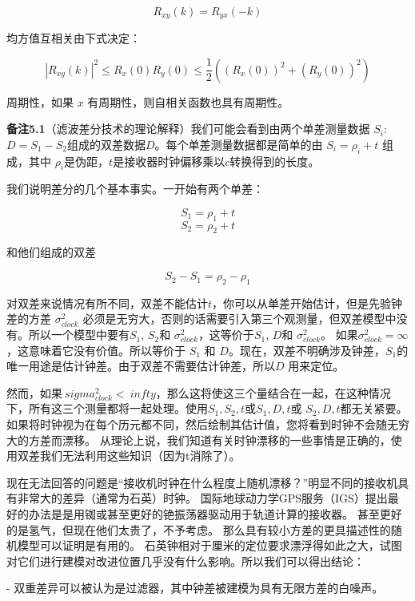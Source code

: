         \[ R_{xy}(k)=R_{yx}(-k) \]
        
        均方值互相关由下式决定：
        
         \[ |R_{xy}(k)|^{2}\leq R_{x}(0)R_{y}(0)\leq\frac{1}{2}((R_{x}(0))^{2}+(R_{y}(0))^{2}) \]
         
        周期性，如果 $ x $ 有周期性，则自相关函数也具有周期性。
        
       \textbf{ 备注5.1}（滤波差分技术的理论解释）我们可能会看到由两个单差测量数据 $ S_{i} $: $ D=S_{1}-S_{2} $组成的双差数据$ D $。每个单差测量数据都是简单的由 $ S_{i}=\rho_{i}+t $ 组成，其中 $ \rho_{i} $是伪距，$ t $是接收器时钟偏移乘以$ c $转换得到的长度。
       
       我们说明差分的几个基本事实。一开始有两个单差：
       
        \[ S_{1}=\rho_{1}+t \]
       \[ S_{2}=\rho_{2}+t \]
       
       和他们组成的双差
       
       \[ S_{2}-S_{1}=\rho_{2}-\rho_{1} \]
       
       对双差来说情况有所不同，双差不能估计$ t $，你可以从单差开始估计，但是先验钟差的方差  $ \sigma_{clock}^{2} $ 必须是无穷大，否则的话需要引入第三个观测量，但双差模型中没有。所以一个模型中要有$ S_{1} $, $ S_{2} $和 $ \sigma_{clock}^{2} $，这等价于$ S_{1} $, $ D $和  $ \sigma_{clock}^{2} $。 如果$ \sigma_{clock}^{2} = \infty $，这意味着它没有价值。所以等价于 $ S_{1} $ 和 $ D $。现在，双差不明确涉及钟差，$ S_ {1} $的唯一用途是估计钟差。由于双差不需要估计钟差，所以$ D $ 用来定位。
       
       然而，如果$ \ sigma_ {clock} ^ {2} <\ infty $，那么这将使这三个量结合在一起，在这种情况下，所有这三个测量都将一起处理。使用$S_{1},S_{2},t  $或$ S_{1},D,t $或 $ S_{2},D,t $都无关紧要。如果将时钟视为在每个历元都不同，然后绘制其估计值，您将看到时钟不会随无穷大的方差而漂移。 从理论上说，我们知道有关时钟漂移的一些事情是正确的，使用双差我们无法利用这些知识（因为t消除了）。
       
       现在无法回答的问题是“接收机时钟在什么程度上随机漂移？”明显不同的接收机具有非常大的差异（通常为石英）时钟。 国际地球动力学GPS服务（IGS）提出最好的办法是是用铷或甚至更好的铯振荡器驱动用于轨道计算的接收器。 甚至更好的是氢气，但现在他们太贵了，不予考虑。 那么具有较小方差的更具描述性的随机模型可以证明是有用的。 石英钟相对于厘米的定位要求漂浮得如此之大，试图对它们进行建模对改进位置几乎没有什么影响。所以我们可以得出结论：
       
       - 双重差异可以被认为是过滤器，其中钟差被建模为具有无限方差的白噪声。
       
